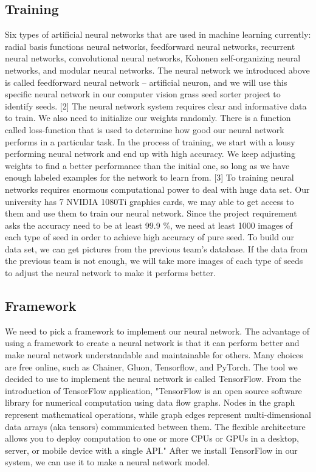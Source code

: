\subsection{Training}
Six types of artificial neural networks that are used in machine learning currently: radial basis functions neural networks, feedforward neural networks, recurrent neural networks, convolutional neural networks, Kohonen self-organizing neural networks, and modular neural networks. The neural network we introduced above is called feedforward neural network – artificial neuron, and we will use this specific neural network in our computer vision grass seed sorter project to identify seeds.  [2]
The neural network system requires clear and informative data to train.  We also need to initialize our weights randomly. There is a function called loss-function that is used to determine how good our neural network performs in a particular task. In the process of training, we start with a lousy performing neural network and end up with high accuracy. We keep adjusting weights to find a better performance than the initial one, so long as we have enough labeled examples for the network to learn from.  [3]
To training neural networks requires enormous computational power to deal with huge data set. Our university has 7 NVIDIA 1080Ti graphics cards, we may able to get access to them and use them to train our neural network. Since the project requirement asks the accuracy need to be at least 99.9 \%, we need at least 1000 images of each type of seed in order to achieve high accuracy of pure seed. To build our data set, we can get pictures from the previous team’s database. If the data from the previous team is not enough, we will take more images of each type of seeds to adjust the neural network to make it performs better.

\subsection{Framework}
We need to pick a framework to implement our neural network. The advantage of using a framework to create a neural network is that it can perform better and make neural network understandable and maintainable for others. Many choices are free online, such as Chainer, Gluon, Tensorflow, and PyTorch. The tool we decided to use to implement the neural network is called TensorFlow.
From the introduction of TensorFlow application, "TensorFlow is an open source software library for numerical computation using data flow graphs. Nodes in the graph represent mathematical operations, while graph edges represent multi-dimensional data arrays (aka tensors) communicated between them. The flexible architecture allows you to deploy computation to one or more CPUs or GPUs in a desktop, server, or mobile device with a single API." After we install TensorFlow in our system, we can use it to make a neural network model.   

